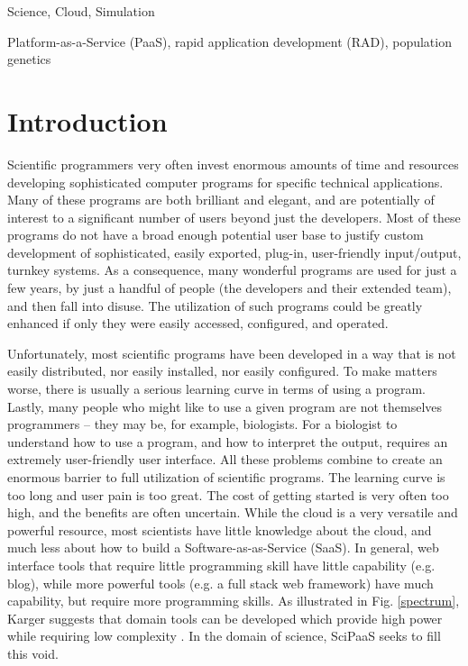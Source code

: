 \documentclass[10pt,reprint]{socc14}
\begin{document}

\terms
Science, Cloud, Simulation

\keywords
Platform-as-a-Service (PaaS), rapid application development (RAD), population genetics

\section{Introduction}

Scientific programmers very often invest enormous amounts of time and resources developing sophisticated computer programs for specific technical applications. Many of these programs are both brilliant and elegant, and are potentially of interest to a significant number of users beyond just the developers. Most of these programs do not have a broad enough potential user base to justify custom development of sophisticated, easily exported, plug-in, user-friendly input/output, turnkey systems.  As a consequence, many wonderful programs are used for just a few years, by just a handful of people (the developers and their extended team), and then fall into disuse. The utilization of such programs could be greatly enhanced if only they were easily accessed, configured, and operated.

Unfortunately, most scientific programs have been developed in a way that is not easily distributed, nor easily installed, nor easily configured. To make matters worse, there is usually a serious learning curve in terms of using a program. Lastly, many people who might like to use a given program are not themselves programmers – they may be, for example, biologists.  For a biologist to understand how to use a program, and how to interpret the output, requires an extremely user-friendly user interface.  All these problems combine to create an enormous barrier to full utilization of scientific programs. The learning curve is too long and user pain is too great. The cost of getting started is very often too high, and the benefits are often uncertain. 
While the cloud is a very versatile and powerful resource, most scientists have little knowledge about the cloud, and much less about how to build a Software-as-as-Service (SaaS). In general, web interface tools that require little programming skill have little capability (e.g. blog), while more powerful tools (e.g. a full stack web framework) have much capability, but require more programming skills. As illustrated in Fig. \ref{spectrum}, Karger suggests that domain tools can be developed which provide high power while requiring low complexity \cite{karger14}. In the domain of science, SciPaaS seeks to fill this void.
\end{document}
